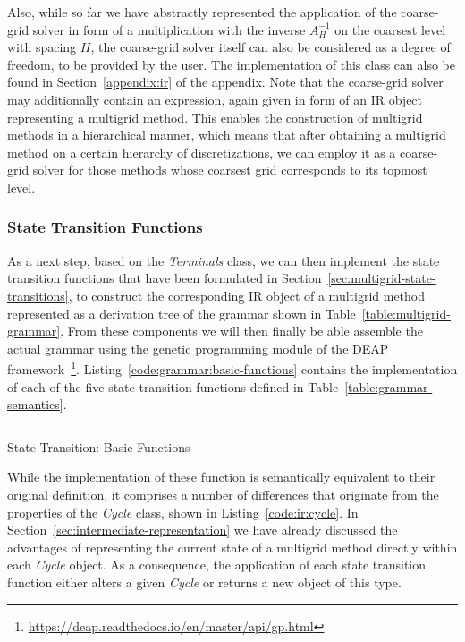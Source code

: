 Also, while so far we have abstractly represented the application of the coarse-grid solver in form of a multiplication with the inverse $A^{-1}_H$ on the coarsest level with spacing $H$, the coarse-grid solver itself can also be considered as a degree of freedom, to be provided by the user.
The implementation of this class can also be found in Section~\ref{appendix:ir} of the appendix.
Note that the coarse-grid solver may additionally contain an expression, again given in form of an IR object representing a multigrid method.
This enables the construction of multigrid methods in a hierarchical manner, which means that after obtaining a multigrid method on a certain hierarchy of discretizations, we can employ it as a coarse-grid solver for those methods whose coarsest grid corresponds to its topmost level.

\subsubsection{State Transition Functions}
\label{sec:evostencils:state-transition-functions}
As a next step, based on the \emph{Terminals} class, we can then implement the state transition functions that have been formulated in Section~\ref{sec:multigrid-state-transitions}, to construct the corresponding IR object of a multigrid method represented as a derivation tree of the grammar shown in Table~\ref{table:multigrid-grammar}.
From these components we will then finally be able assemble the actual grammar using the genetic programming module of the DEAP framework~\footnote{\url{https://deap.readthedocs.io/en/master/api/gp.html}}.
Listing~\ref{code:grammar:basic-functions} contains the implementation of each of the five state transition functions defined in Table~\ref{table:grammar-semantics}.
\begin{listing}
	\inputminted{python}{evostencils/grammar/base.py}
	\caption{State Transition: Basic Functions}
	\label{code:grammar:basic-functions}
\end{listing}
While the implementation of these function is semantically equivalent to their original definition, it comprises a number of differences that originate from the properties of the \emph{Cycle} class, shown in Listing~\ref{code:ir:cycle}.
In Section~\ref{sec:intermediate-representation} we have already discussed the advantages of representing the current state of a multigrid method directly within each \emph{Cycle} object.
As a consequence, the application of each state transition function either alters a given \emph{Cycle} or returns a new object of this type.
